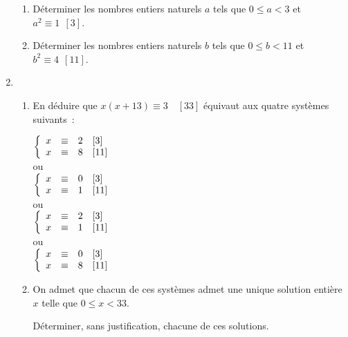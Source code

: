 \begin{enumerate}
\begin{enumerate}[label=\alph*.]
          \item Déterminer les nombres entiers naturels $a$ tels que $0 \leqslant a < 3$ et $a^2 \equiv 1 \:\:  [3]$.
          \item Déterminer les nombres entiers naturels $b$ tels que $0 \leqslant b < 11$ et $b^2 \equiv 4\:\: [11]$.
     \end{enumerate}
     \item
     \begin{enumerate}[label=\alph*.]
          \item En déduire que $x(x + 13) \equiv 3 \quad[33]$ équivaut aux quatre systèmes suivants~:
          \medskip
          \begin{center}
               $\left\{\begin{array}{l c l}
                         x &\equiv&2\quad [3]\\
                         x&\equiv &8\quad[11]
               \end{array}\right. $\\
               ou\\
               $\left\{\begin{array}{l c l}
                         x &\equiv& 0\quad[3]\\
                         x &\equiv& 1 \quad[11]
               \end{array}\right.$\\
               ou\\
               $\left\{\begin{array}{l c l}
                         x  &\equiv& 2\quad[3]\\
                         x &\equiv&1 \quad[11]
               \end{array}\right.$\\
               ou\\
               $\left\{\begin{array}{l c l}
                         x &\equiv& 0\quad [3]\\
                         x &\equiv& 8 \quad [11]
               \end{array}\right.$
          \end{center}
          \item On admet que chacun de ces systèmes admet une unique solution entière $x$ telle que $0 \leqslant x < 33$.
          \par
          Déterminer, sans justification, chacune de ces solutions.
     \end{enumerate}

\end{enumerate}
